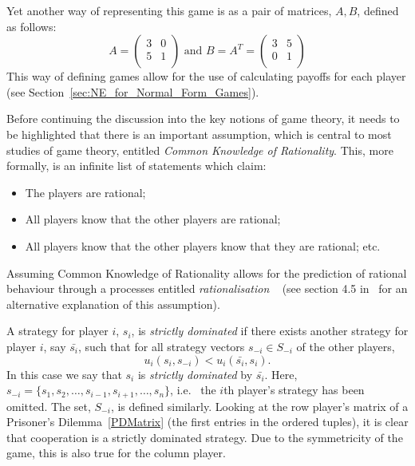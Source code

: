 Yet another way of representing this game is as a pair of matrices, \(A, B\),
defined as follows:
\[
    A = 
    \begin{pmatrix}
       3 & 0\\
       5 & 1\\ 
    \end{pmatrix}
    \text{ and } B = A^{T} =
    \begin{pmatrix}
        3 & 5\\
        0 & 1\\
    \end{pmatrix}
\]
This way of defining games allow for the use of calculating payoffs for each
player (see Section~\ref{sec:NE_for_Normal_Form_Games}).

Before continuing the discussion into the key notions of game theory, it needs
to be highlighted that there is an important assumption, which is central to
most studies of game theory, entitled \textit{Common Knowledge of Rationality}.
This, more formally, is an infinite list of statements which claim:
    \begin{itemize}
        \item The players are rational;
        \item All players know that the other players are rational;
        \item All players know that the other players know that they are 
        rational; etc.    
    \end{itemize}
Assuming Common Knowledge of Rationality allows for the prediction of rational
behaviour through a processes entitled \textit{rationalisation}
~\cite{Knight2019}
(see section 4.5 in~\cite{maschler_solan_zamir_2013} for an alternative
explanation of this assumption). 


A strategy for player \(i\), \(s_{i}\), is \textit{strictly dominated} if there
exists another strategy for player \(i\), say \(\bar{s_{i}}\), such that for all
strategy vectors \(s_{-i} \in S_{-i}\) of the other players, 
\[
    u_{i}(s_{i}, s_{-i}) < u_{i}(\bar{s_{i}}, s_{i}).
\]
In this case we say that \(s_{i}\) is \textit{strictly dominated} by
\(\bar{s_{i}}\). Here, 
\(s_{-i} = \{s_{1}, s_{2}, \ldots, s_{i-1}, s_{i+1}, \ldots, s_{n}\} \), i.e. \
the \(i\)th player's strategy has been omitted. The 
set, \(S_{-i}\), is defined similarly. Looking at the row player's matrix of a
Prisoner's Dilemma~\ref{PDMatrix} (the first entries in the ordered tuples), it
is clear that cooperation is a strictly dominated strategy. Due to the
symmetricity of the game, this is also true for the column
player.~\cite{maschler_solan_zamir_2013}



